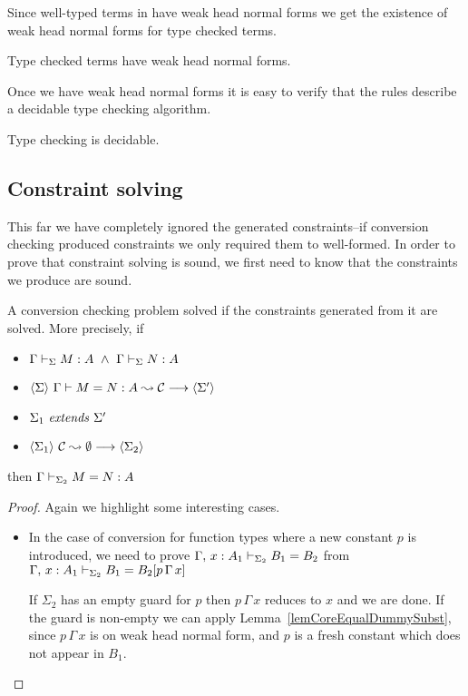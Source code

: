 Since well-typed terms in {\Core} have weak head normal forms we get the
existence of weak head normal forms for type checked terms.

\begin{corollary}
    Type checked terms have weak head normal forms.
\end{corollary}

Once we have weak head normal forms it is easy to verify that the rules
describe a decidable type checking algorithm.

\begin{corollary}
    Type checking is decidable.
\end{corollary}

\subsection{Constraint solving}

This far we have completely ignored the generated constraints--if conversion
checking produced constraints we only required them to well-formed. In order to
prove that constraint solving is sound, we first need to know that the
constraints we produce are sound.

\begin{lemma} \label{thmConvSound}
    A conversion checking problem solved if the constraints generated from it
    are solved. More precisely, if
    \begin{itemize}
	\item \( \HasTypeCS \Sigma \Gamma M A ~ \wedge ~
		 \HasTypeCS \Sigma \Gamma N A
	      \)
	\item $\ExplicitJudgement \Sigma {\Equal M N A \Cs} {\Sigma'}$
	\item $ \Extends {\Sigma_1} {\Sigma'}$
	\item $\ExplicitJudgement
		{\Sigma_1}
		{\CheckConstr \Cs \emptyset}
		{\Sigma_2}
	      $
    \end{itemize}
    then \( \EqualCS {\Sigma_2} \Gamma M N A \)
\end{lemma}

\begin{proof}
    Again we highlight some interesting cases.
    \begin{itemize}
	\item In the case of conversion for function types where a new constant $p$
	is introduced, we need to prove  $\EqualTypeCS {\Sigma_2} {\Ext
	\Gamma x : A_1} {B_1} {B_2}$ from $\EqualTypeCS {\Sigma_2} {\Ext \Gamma
	x : A_1} {B_1} {\SubstD {B_2} {p \, \Gamma \, x}}$

	If $\Sigma_2$ has an empty guard for $p$ then $p \,
	\Gamma \, x$ reduces to $x$ and we are done. If the guard is non-empty
	we can apply Lemma~\ref{lemCoreEqualDummySubst}, since $p \, \Gamma \,
	x$ is on weak head normal form, and $p$ is a fresh constant which does
	not appear in $B_1$.
    \end{itemize}
\end{proof}


